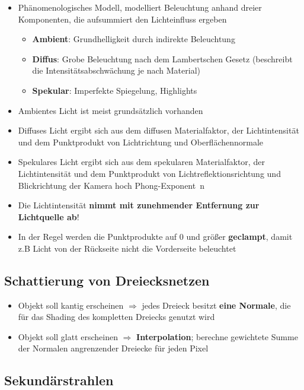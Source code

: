 \documentclass[10pt,a4paper]{article}
\begin{document}
	\begin{itemize}
		\item Phänomenologisches Modell, modelliert Beleuchtung anhand dreier Komponenten, die aufsummiert den Lichteinfluss ergeben
		\begin{itemize}
			\item \textbf{Ambient}: Grundhelligkeit durch indirekte Beleuchtung
			\item \textbf{Diffus}: Grobe Beleuchtung nach dem Lambertschen Gesetz (beschreibt die Intensitätsabschwächung je nach Material)
			\item \textbf{Spekular}: Imperfekte Spiegelung, \glqq Highlights\grqq
		\end{itemize}
		\item Ambientes Licht ist meist grundsätzlich vorhanden
		\item Diffuses Licht ergibt sich aus dem diffusen Materialfaktor, der Lichtintensität und dem Punktprodukt von Lichtrichtung und Oberflächennormale
		\item Spekulares Licht ergibt sich aus dem spekularen Materialfaktor, der Lichtintensität und dem Punktprodukt von Lichtreflektionsrichtung und Blickrichtung der Kamera hoch \glqq Phong-Exponent\grqq\ n
		\item Die Lichtintensität \textbf{nimmt mit zunehmender Entfernung zur Lichtquelle ab}!
		\item In der Regel werden die Punktprodukte auf 0 und größer \textbf{\glqq geclampt\grqq}, damit z.B Licht von der Rückseite nicht die Vorderseite beleuchtet
	\end{itemize}

	\subsection{Schattierung von Dreiecksnetzen}
	\label{rt:sub:schattierung_von_dreiecksnetzen}
	
	\begin{itemize}
		\item Objekt soll kantig erscheinen $\Rightarrow$ jedes Dreieck besitzt \textbf{eine Normale}, die für das Shading des kompletten Dreiecks genutzt wird
		\item Objekt soll glatt erscheinen $\Rightarrow$ \textbf{Interpolation}; berechne gewichtete Summe der Normalen angrenzender Dreiecke für jeden Pixel
	\end{itemize}

	\subsection{Sekundärstrahlen}
	\label{rt:sub:sekundaerstrahlen}
	
\end{document}

